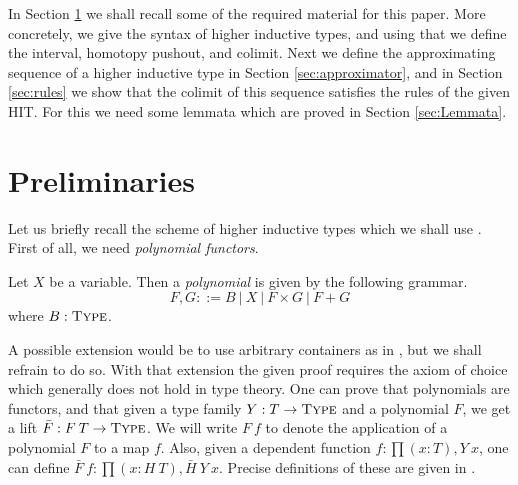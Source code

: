\documentclass[a4paper,UKenglish]{lipics-v2016}
\newcommand{\Type}[0]{\operatorname{\textsc{Type}}}
\begin{document}
In Section \ref{sec:prelims} we shall recall some of the required material for this paper.
More concretely, we give the syntax of higher inductive types, and using that we define the interval, homotopy pushout, and colimit.
Next we define the approximating sequence of a higher inductive type in Section \ref{sec:approximator}, and in Section \ref{sec:rules} we show that the colimit of this sequence satisfies the rules of the given HIT.
For this we need some lemmata which are proved in Section \ref{sec:Lemmata}.

\section{Preliminaries}
\label{sec:prelims}
Let us briefly recall the scheme of higher inductive types which we shall use \cite{basoldhigher}.
First of all, we need \emph{polynomial functors}.
\begin{definition}
Let $X$ be a variable.
Then a \emph{polynomial} is given by the following grammar.
\[
F, G ::= B \ | \ X \ | \ F \times G \ | \ F + G
\]
where $B : \Type$.
\end{definition}
A possible extension would be to use arbitrary containers as in \cite{abbott2005containers}, but we shall refrain to do so.
With that extension the given proof requires the axiom of choice which generally does not hold in type theory.
One can prove that polynomials are functors, and that given a type family $Y : T \rightarrow \Type$ and a polynomial $F$, we get a lift $\bar{F} : F \> T \rightarrow \Type$.
We will write $F \> f$ to denote the application of a polynomial $F$ to a map $f$.
Also, given a dependent function $f : \prod (x : T), Y \> x$, one can define $\bar{F} \> f : \prod (x : H \> T), \bar{H} \> Y \> x$.
Precise definitions of these are given in \cite{basoldhigher}.
\end{document}
